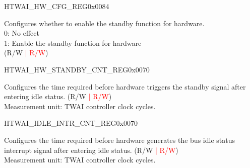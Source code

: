 \begin{register}{H}{TWAI\_HW\_CFG\_REG}{0x0084}\label{regdesc:TWAIHWCFGREG}
%
%
\regnewline%
\begin{regdesc}\begin{reglist}
\label{fielddesc:TWAIHWSTANDBYEN}\item [TWAI\_HW\_STANDBY\_EN] Configures whether to enable the standby function for hardware.\\
0: No effect\\
1: Enable the standby function for hardware\\
(R/W \textcolor{red}{| R/W})
\end{reglist}\end{regdesc}
\end{register}


\begin{register}{H}{TWAI\_HW\_STANDBY\_CNT\_REG}{0x0070}\label{regdesc:TWAIHWSTANDBYCNTREG}
%
\regnewline%
\begin{regdesc}\begin{reglist}
\label{fielddesc:TWAISTANDBYWAITCNT}\item [TWAI\_STANDBY\_WAIT\_CNT] Configures the time required before hardware triggers the standby signal after entering idle status. (R/W \textcolor{red}{| R/W})\\
Measurement unit: TWAI controller clock cycles. 
\end{reglist}\end{regdesc}
\end{register}


\begin{register}{H}{TWAI\_IDLE\_INTR\_CNT\_REG}{0x0070}\label{regdesc:TWAIIDLEINTRCNTREG}
%
\regnewline%
\begin{regdesc}\begin{reglist}
\label{fielddesc:TWAIIDLEINTRCNT}\item [TWAI\_IDLE\_INTR\_CNT] Configures the time required before hardware generates the bus idle status interrupt signal after entering idle status. (R/W \textcolor{red}{| R/W})\\
Measurement unit: TWAI controller clock cycles. 
\end{reglist}\end{regdesc}
\end{register}


